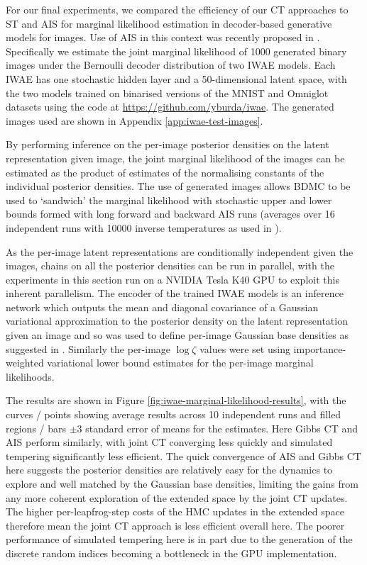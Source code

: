 For our final experiments, we compared the efficiency of our \ac{CT} approaches to \ac{ST} and \ac{AIS} for marginal likelihood estimation in decoder-based generative models for images. Use of \ac{AIS} in this context was recently proposed in \citep{wu2016quantitative}. Specifically we estimate the joint marginal likelihood of 1000 generated binary images under the Bernoulli decoder distribution of two \ac{IWAE} \citep{burda2016importance} models. Each \ac{IWAE} has one stochastic hidden layer and a 50-dimensional latent space, with the two models trained on binarised versions of the MNIST \citep{lecun1998gradient} and Omniglot \citep{lake2015human} datasets using the code at \url{https://github.com/yburda/iwae}. The generated images used are shown in Appendix \ref{app:iwae-test-images}.

By performing inference on the per-image posterior densities on the latent representation given image, the joint marginal likelihood of the images can be estimated as the product of estimates of the normalising constants of the individual posterior densities. The use of generated images allows \ac{BDMC} \citep{grosse2015sandwiching} to be used to `sandwich' the marginal likelihood with stochastic upper and lower bounds formed with long forward and backward \ac{AIS} runs (averages over 16 independent runs with 10000 inverse temperatures as used in \citep{wu2016quantitative}). 

As the per-image latent representations are conditionally independent given the images, chains on all the posterior densities can be run in parallel, with the experiments in this section run on a NVIDIA Tesla K40 GPU to exploit this inherent parallelism. The encoder of the trained \ac{IWAE} models is an inference network which outputs the mean and diagonal covariance of a Gaussian variational approximation to the posterior density on the latent representation given an image and so was used to define per-image Gaussian base densities as suggested in \citep{wu2016quantitative}. Similarly the per-image $\log \zeta$ values were set using importance-weighted variational lower bound estimates for the per-image marginal likelihoods.

The results are shown in Figure \ref{fig:iwae-marginal-likelihood-results}, with the curves / points showing average results across 10 independent runs and filled regions / bars $\pm 3$ standard error of means for the estimates. Here Gibbs \ac{CT} and \ac{AIS} perform similarly, with joint \ac{CT} converging less quickly and simulated tempering significantly less efficient. The quick convergence of \ac{AIS} and Gibbs \ac{CT} here suggests the posterior densities are relatively easy for the dynamics to explore and well matched by the Gaussian base densities, limiting the gains from any more coherent exploration of the extended space by the joint \ac{CT} updates. The higher per-leapfrog-step costs of the \ac{HMC} updates in the extended space therefore mean the joint \ac{CT} approach is less efficient overall here. The poorer performance of simulated tempering here is in part due to the generation of the discrete random indices becoming a bottleneck in the \ac{GPU} implementation.

